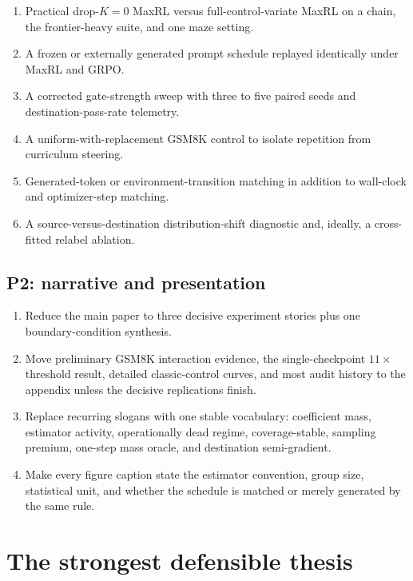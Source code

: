 \documentclass[11pt]{article}
\theoremstyle{definition}
\theoremstyle{remark}
\begin{document}
\begin{enumerate}[leftmargin=2em,label=\textbf{P1.\arabic*.}]
\item Practical drop-$K=0$ MaxRL versus full-control-variate MaxRL on a chain, the frontier-heavy suite, and one maze setting.
\item A frozen or externally generated prompt schedule replayed identically under MaxRL and GRPO.
\item A corrected gate-strength sweep with three to five paired seeds and destination-pass-rate telemetry.
\item A uniform-with-replacement GSM8K control to isolate repetition from curriculum steering.
\item Generated-token or environment-transition matching in addition to wall-clock and optimizer-step matching.
\item A source-versus-destination distribution-shift diagnostic and, ideally, a cross-fitted relabel ablation.
\end{enumerate}

\subsection{P2: narrative and presentation}

\begin{enumerate}[leftmargin=2em,label=\textbf{P2.\arabic*.}]
\item Reduce the main paper to three decisive experiment stories plus one boundary-condition synthesis.
\item Move preliminary GSM8K interaction evidence, the single-checkpoint $11\times$ threshold result, detailed classic-control curves, and most audit history to the appendix unless the decisive replications finish.
\item Replace recurring slogans with one stable vocabulary: coefficient mass, estimator activity, operationally dead regime, coverage-stable, sampling premium, one-step mass oracle, and destination semi-gradient.
\item Make every figure caption state the estimator convention, group size, statistical unit, and whether the schedule is matched or merely generated by the same rule.
\end{enumerate}

\section{The strongest defensible thesis}
\end{document}
